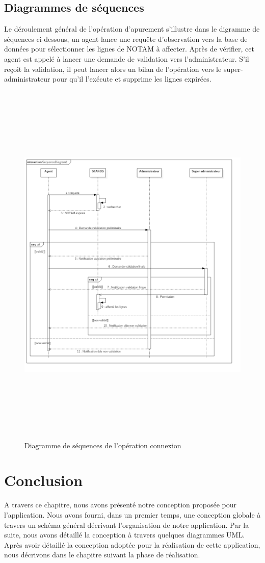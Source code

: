 \subsection{Diagrammes de séquences}
Le déroulement général de l’opération d’apurement s’illustre dans le digramme de séquences ci-dessous, un agent lance une requête d’observation vers la base de données pour sélectionner les lignes de NOTAM à affecter. Après de vérifier, cet agent est appelé à lancer une demande de validation vers l’administrateur. S’il reçoit la validation, il peut lancer alors un bilan de l’opération vers le super-administrateur pour qu’il l’exécute et supprime les lignes expirées.\\
\begin{figure}[!h]
\begin{center}
\includegraphics[width=17cm,height=18cm]{besoins/SequenceDiagram1.png}
\end{center}
\caption{Diagramme de séquences de l'opération connexion}
\end{figure}
\newpage
\section*{Conclusion}
A travers ce chapitre, nous avons présenté notre conception proposée pour l’application. Nous avons fourni, dans un premier temps, une conception globale à travers un schéma général décrivant l’organisation de notre application. Par la suite, nous avons détaillé la conception à travers quelques diagrammes UML.\\
Après avoir détaillé la conception adoptée pour la réalisation de cette application, nous décrivons dans le chapitre suivant la phase de réalisation.